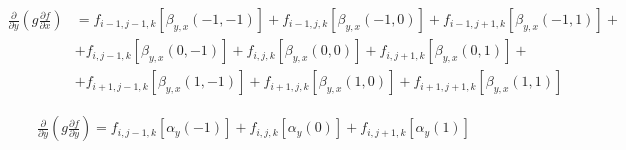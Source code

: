 \begin{equation*}
    \begin{split}
        \frac
            {\partial}
            {\partial y}
        \left(
            g
            \frac
                {\partial f}
                {\partial x}
        \right)
        &
        =
        f_{i-1, j-1, k}
        \left[
            \beta_{y, x} \left(-1, -1\right)
        \right]
        +
        f_{i-1, j, k}
        \left[
            \beta_{y, x} \left(-1, 0\right)
        \right]
        +
        f_{i-1, j+1, k}
        \left[
            \beta_{y, x} \left(-1, 1\right)
        \right]
        +
        \\
        &
        +
        f_{i, j-1, k}
        \left[
            \beta_{y, x} \left(0,-1\right)
        \right]
        +
        f_{i, j, k}
        \left[
            \beta_{y, x} \left(0,0\right)
        \right]
        +
        f_{i, j+1, k}
        \left[
            \beta_{y, x} \left(0, 1\right)
        \right]
        +
        \\
        &
        +
        f_{i+1, j-1, k}
        \left[
            \beta_{y, x} \left(1, -1\right)
        \right]
        +
        f_{i+1, j, k}
        \left[
            \beta_{y, x} \left(1, 0\right)
        \right]
        +
        f_{i+1, j+1, k}
        \left[
            \beta_{y, x} \left(1, 1\right)
        \right]
    \end{split}
\end{equation*}

\begin{equation*}
    \begin{split}
        \frac
            {\partial}
            {\partial y}
        \left(
            g
            \frac
                {\partial f}
                {\partial y}
        \right)
        =
        f_{i, j-1, k}
        \left[
            \alpha_{y} \left(-1\right)
        \right]
        +
        f_{i, j, k}
        \left[
            \alpha_{y} \left(0\right)
        \right]
        +
        f_{i, j+1, k}
        \left[
            \alpha_{y} \left(1\right)
        \right]
    \end{split}
\end{equation*}

